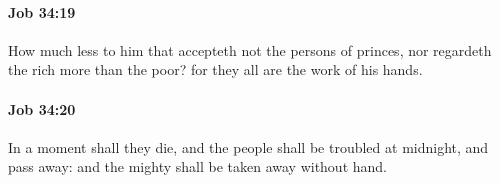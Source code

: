 		\paragraph{Job 34:19} %
			\label{JOB-34-19}

			How much less to him that accepteth not the persons of princes, nor regardeth the rich more than the poor? for they all are the work of his hands.


		\paragraph{Job 34:20} %
			\label{JOB-34-20}

			In a moment shall they die, and the people shall be troubled at midnight, and pass away: and the mighty shall be taken away without hand.


